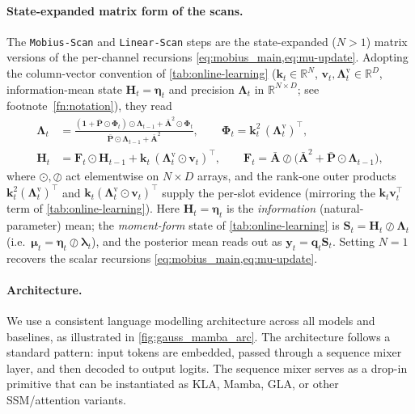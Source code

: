 \documentclass{article}
\newcommand{\our}{\textsc{KLA}\xspace}
\begin{document}
\paragraph{State-expanded matrix form of the scans.}
The \texttt{Mobius-Scan} and \texttt{Linear-Scan} steps are the state-expanded ($N{>}1$) matrix versions of the per-channel recursions \cref{eq:mobius_main,eq:mu-update}. Adopting the column-vector convention of \cref{tab:online-learning} ($\mathbf{k}_t\in\mathbb{R}^{N}$, $\mathbf{v}_t,\boldsymbol{\Lambda}_t^{\mathrm v}\in\mathbb{R}^{D}$, information-mean state $\mathbf{H}_t\!=\!\boldsymbol{\eta}_t$ and precision $\boldsymbol{\Lambda}_t$ in $\mathbb{R}^{N\times D}$; see footnote~\ref{fn:notation}), they read
\begin{align}
\boldsymbol{\Lambda}_t
&= \frac{(\mathbf{1}+\bar{\mathbf{P}}\odot\boldsymbol{\Phi}_t)\odot\boldsymbol{\Lambda}_{t-1} + \bar{\mathbf{A}}^2\odot\boldsymbol{\Phi}_t}{\bar{\mathbf{P}}\odot\boldsymbol{\Lambda}_{t-1} + \bar{\mathbf{A}}^2},
\qquad \boldsymbol{\Phi}_t = \mathbf{k}_t^2\,(\boldsymbol{\Lambda}_t^{\mathrm v})^{\!\top},
\label{eq:kla-prec-mat}\\[2pt]
\mathbf{H}_t
&= \mathbf{F}_t\odot\mathbf{H}_{t-1} + \mathbf{k}_t\,(\boldsymbol{\Lambda}_t^{\mathrm v}\odot\mathbf{v}_t)^{\!\top},
\qquad \mathbf{F}_t = \bar{\mathbf{A}}\oslash\bigl(\bar{\mathbf{A}}^2+\bar{\mathbf{P}}\odot\boldsymbol{\Lambda}_{t-1}\bigr),
\label{eq:kla-mean-mat}
\end{align}
where $\odot,\oslash$ act elementwise on $N\times D$ arrays, and the rank-one outer products $\mathbf{k}_t^2(\boldsymbol{\Lambda}_t^{\mathrm v})^{\!\top}$ and $\mathbf{k}_t(\boldsymbol{\Lambda}_t^{\mathrm v}\odot\mathbf{v}_t)^{\!\top}$ supply the per-slot evidence (mirroring the $\mathbf{k}_t\mathbf{v}_t^\top$ term of \cref{tab:online-learning}). Here $\mathbf{H}_t=\boldsymbol{\eta}_t$ is the \emph{information} (natural-parameter) mean; the \emph{moment-form} state of \cref{tab:online-learning} is $\mathbf{S}_t=\mathbf{H}_t\oslash\boldsymbol{\Lambda}_t$ (i.e.\ $\boldsymbol{\mu}_t=\boldsymbol{\eta}_t\oslash\boldsymbol{\lambda}_t$), and the posterior mean reads out as $\mathbf{y}_t=\mathbf{q}_t\mathbf{S}_t$. Setting $N{=}1$ recovers the scalar recursions \cref{eq:mobius_main,eq:mu-update}.

\paragraph{Architecture.}
\label{par:arch}
We use a consistent language modelling architecture across all models and baselines, as illustrated in \cref{fig:gauss_mamba_arc}. The architecture follows a standard pattern: input tokens are embedded, passed through a sequence mixer layer, and then decoded to output logits. The sequence mixer serves as a drop-in primitive that can be instantiated as \our, Mamba, GLA, or other SSM/attention variants.
\end{document}
